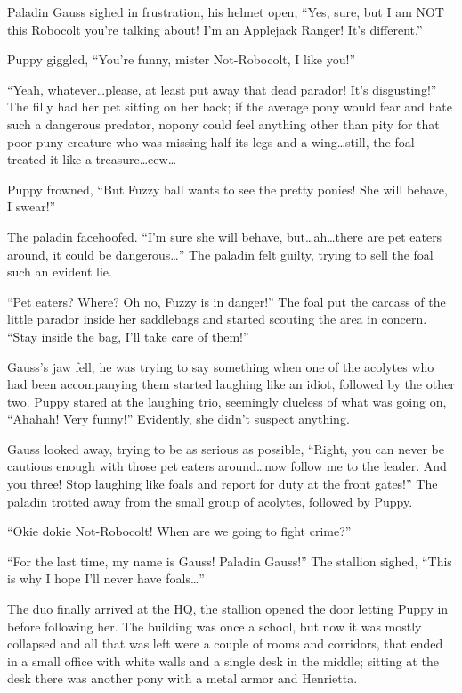 Paladin Gauss sighed in frustration, his helmet open, ``Yes, sure, but I am NOT this Robocolt you're talking about! I'm an Applejack Ranger! It's different.''

Puppy giggled, ``You're funny, mister Not-Robocolt, I like you!''

``Yeah, whatever\dots please, at least put away that dead parador! It's disgusting!'' The filly had her pet sitting on her back; if the average pony would fear and hate such a dangerous predator, nopony could feel anything other than pity for that poor puny creature who was missing half its legs and a wing\dots still, the foal treated it like a treasure\dots eew\dots

Puppy frowned, ``But Fuzzy ball wants to see the pretty ponies! She will behave, I swear!''

The paladin facehoofed. ``I'm sure she will behave, but\dots ah\dots there are pet eaters around, it could be dangerous\dots'' The paladin felt guilty, trying to sell the foal such an evident lie.

``Pet eaters? Where? Oh no, Fuzzy is in danger!'' The foal put the carcass of the little parador inside her saddlebags and started scouting the area in concern. ``Stay inside the bag, I'll take care of them!''

Gauss's jaw fell; he was trying to say something when one of the acolytes who had been accompanying them started laughing like an idiot, followed by the other two. Puppy stared at the laughing trio, seemingly clueless of what was going on, ``Ahahah! Very funny!'' Evidently, she didn't suspect anything.

Gauss looked away, trying to be as serious as possible, ``Right, you can never be cautious enough with those pet eaters around\dots now follow me to the leader. And you three! Stop laughing like foals and report for duty at the front gates!'' The paladin trotted away from the small group of acolytes, followed by Puppy.

``Okie dokie Not-Robocolt! When are we going to fight crime?''

``For the last time, my name is Gauss! Paladin Gauss!'' The stallion sighed, ``This is why I hope I'll never have foals\dots''

The duo finally arrived at the HQ, the stallion opened the door letting Puppy in before following her. The building was once a school, but now it was mostly collapsed and all that was left were a couple of rooms and corridors, that ended in a small office with white walls and a single desk in the middle; sitting at the desk there was another pony with a metal armor and Henrietta.


